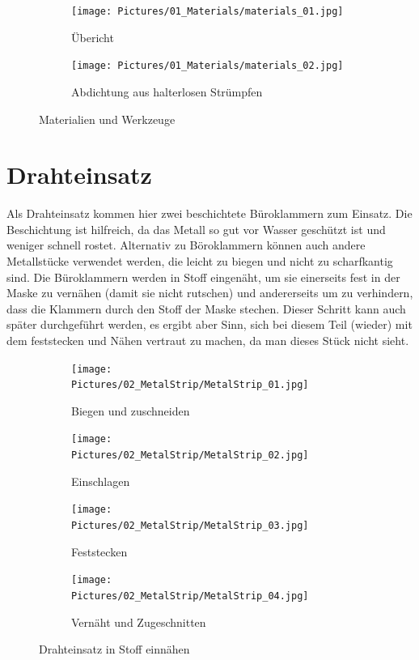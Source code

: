 \documentclass[12pt,parskip=full]{scrartcl}
\begin{document}
\begin{figure}[h]
    \vspace{0.5cm}
    \centering
    \begin{subfigure}{0.48\textwidth}
        \centering
        \texttt{[image: Pictures/01\_Materials/materials\_01.jpg]}
        \caption{Übericht}
    \end{subfigure}
    \begin{subfigure}{0.48\textwidth}
        \centering
        \texttt{[image: Pictures/01\_Materials/materials\_02.jpg]}
        \caption{Abdichtung aus halterlosen Strümpfen}
    \end{subfigure}
    \caption{Materialien und Werkzeuge}
\end{figure}

\section{Drahteinsatz}
Als Drahteinsatz kommen hier zwei beschichtete Büroklammern zum Einsatz. Die Beschichtung ist hilfreich, da das Metall so gut vor Wasser geschützt ist und weniger schnell rostet. Alternativ zu Böroklammern können auch andere Metallstücke verwendet werden, die leicht zu biegen und nicht zu scharfkantig sind. Die Büroklammern werden in Stoff eingenäht, um sie einerseits fest in der Maske zu vernähen (damit sie nicht rutschen) und andererseits um zu verhindern, dass die Klammern durch den Stoff der Maske stechen. Dieser Schritt kann auch später durchgeführt werden, es ergibt aber Sinn, sich bei diesem Teil (wieder) mit dem feststecken und Nähen vertraut zu machen, da man dieses Stück nicht sieht.\par

\begin{figure}
    \vspace{0.5cm}
    \centering
    \begin{subfigure}{0.48\textwidth}
        \centering
        \texttt{[image: Pictures/02\_MetalStrip/MetalStrip\_01.jpg]}
        \caption{Biegen und zuschneiden}
        \label{MetaStrip1}
    \end{subfigure}
    \begin{subfigure}{0.48\textwidth}
        \centering
        \texttt{[image: Pictures/02\_MetalStrip/MetalStrip\_02.jpg]}
        \caption{Einschlagen}
        \label{MetaStrip2}
    \end{subfigure}
    \begin{subfigure}{0.48\textwidth}
        \centering
        \texttt{[image: Pictures/02\_MetalStrip/MetalStrip\_03.jpg]}
        \caption{Feststecken}
        \label{MetaStrip3}
    \end{subfigure}
    \begin{subfigure}{0.48\textwidth}
        \centering
        \texttt{[image: Pictures/02\_MetalStrip/MetalStrip\_04.jpg]}
        \caption{Vernäht und Zugeschnitten}
        \label{MetaStrip4}
    \end{subfigure}
    \caption{Drahteinsatz in Stoff einnähen}
    \label{MetaStrip}
\end{figure}
\end{document}
